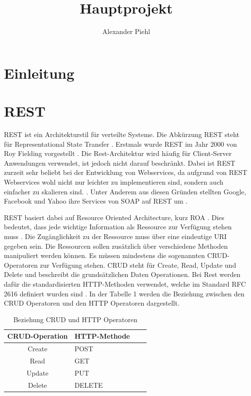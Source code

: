 \documentclass{llncs}
\title{Hauptprojekt}
\author{Alexander Piehl\\\email{alexander.piehl@haw-hamburg.de}
\institute{Hamburg University of Applied Sciences,\\Dept. Computer Science, \\ Berliner Tor 7\\ 20099 Hamburg, Germany\\}}
\begin{document}
\maketitle
\section{Einleitung}
\nocite{*}
\section{REST}
REST ist ein Architekturstil für verteilte Systeme. Die Abkürzung REST steht für Representational State Transfer \cite{chakrabarti2009test}.
Erstmals wurde REST im Jahr 2000 von Roy Fielding vorgestellt \citep{kao2013performance}.
Die Rest-Architektur wird häufig für Client-Server Anwendungen verwendet, ist jedoch nicht darauf beschränkt.
Dabei ist REST zurzeit sehr beliebt bei der Entwicklung von Webservices, da aufgrund von REST Webservices wohl nicht nur leichter zu implementieren sind, sondern auch einfacher zu skalieren sind. \cite{chakrabarti2009test}. 
Unter Anderem aus diesen Gründen stellten Google, Facebook und Yahoo ihre Services von SOAP auf REST um \cite{rodriguez2008restful, navas2014rest}.

REST basiert dabei auf Resource Oriented Architecture, kurz ROA \citep{chakrabarti2009test}. Dies bedeutet, dass jede wichtige Information als Ressource zur Verfügung stehen muss \cite{porres2011modeling}.
Die Zugänglichkeit zu der Ressource muss über eine eindeutige URI gegeben sein. Die Ressourcen sollen zusätzlich über verschiedene Methoden manipuliert werden können. Es müssen mindestens die sogenannten CRUD-Operatoren zur Verfügung stehen. CRUD steht für Create, Read, Update und Delete und beschreibt die grundsätzlichen Daten Operationen. Bei Rest werden dafür die standardisierten HTTP-Methoden verwendet, welche im Standard RFC 2616 definiert wurden sind \citep{kao2013performance}. In der Tabelle 1 werden die Beziehung zwischen den CRUD Operatoren und den HTTP Operatoren dargestellt.

\begin{table}[htbp]
\centering
\label{CRUD_HTTP_Methods}
\begin{tabular}{|c|l|p{4cm}|p{4cm}|}
\hline
\multicolumn{1}{|l|}{CRUD-Operation} & HTTP-Methode \\ \hline
Create & POST  \\ \hline
Read & GET \\ \hline
Update & PUT \\ \hline
Delete & DELETE \\ \hline
\end{tabular}
\caption{Beziehung CRUD und HTTP Operatoren \cite{reza2010framework}}
\end{table}
\end{document}
